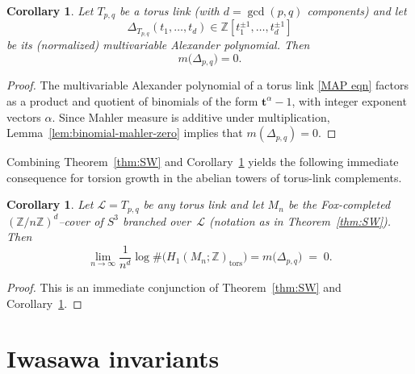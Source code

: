 \documentclass[table]{amsart}
\newtheorem{corollary}[theorem]{Corollary}
\newcommand{\Z}{\mathbb{Z}}
\newcommand{\cL}{\mathcal{L}}
\numberwithin{equation}{section}
\begin{document}
\begin{corollary}\label{cor:torus-measure-zero}
Let $T_{p,q}$ be a torus link (with $d=\gcd(p,q)$ components) and let
\[
\Delta_{T_{p,q}}(t_1,\dots,t_d)\in\Z[t_1^{\pm1},\dots,t_d^{\pm1}]
\]
be its (normalized) multivariable Alexander polynomial. Then
\[
m\big(\Delta_{p,q}\big)=0.
\]
\end{corollary}

\begin{proof}
The multivariable Alexander polynomial of a torus link \eqref{MAP eqn} factors as a product and quotient of binomials of the form $\mathbf{t}^\alpha-1$, with integer exponent vectors $\alpha$. Since Mahler measure is additive under multiplication, Lemma~\ref{lem:binomial-mahler-zero} implies that $m(\Delta_{p,q})=0$.
\end{proof}
Combining Theorem~\ref{thm:SW} and Corollary~\ref{cor:torus-measure-zero} yields the following immediate consequence for torsion growth in the abelian towers of torus-link complements.

\begin{corollary}\label{cor 4.8}
Let $\cL=T_{p,q}$ be any torus link and let $M_n$ be the Fox-completed $(\Z/n\Z)^d$–cover of $S^3$ branched over~$\cL$ (notation as in Theorem~\ref{thm:SW}). Then
\[
\lim_{n\to\infty}\frac{1}{n^d}\log\#\big(H_1(M_n;\Z)_{\mathrm{tors}}\big)
= m\big(\Delta_{p,q}\big) \;=\; 0.
\]
\end{corollary}

\begin{proof}
This is an immediate conjunction of Theorem~\ref{thm:SW} and Corollary~\ref{cor:torus-measure-zero}.
\end{proof}


\section{Iwasawa invariants}
\end{document}
